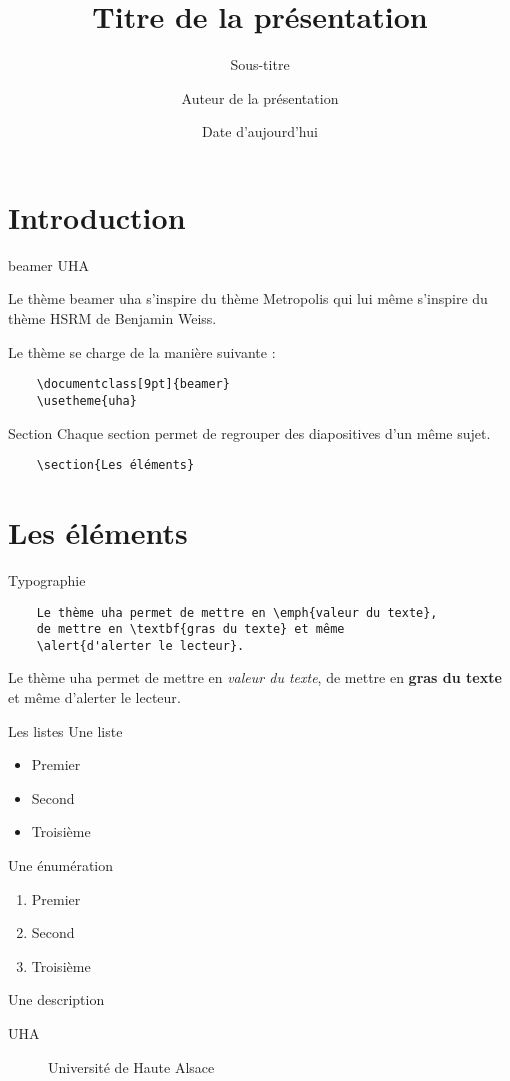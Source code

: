 \documentclass[9pt]{beamer}
\title{Titre de la présentation}
\subtitle{Sous-titre}
\date{Date d'aujourd'hui}
\author{Auteur de la présentation}
\institute{Université de Haute Alsace}
\begin{document}
\begin{frame}
	\titlepage
\end{frame}

\section{Introduction}

\begin{frame}[fragile]{beamer UHA}
	
	Le thème beamer uha s'inspire du thème Metropolis qui lui même s'inspire du thème HSRM de Benjamin Weiss.

	Le thème se charge de la manière suivante :

	\begin{verbatim}
	\documentclass[9pt]{beamer}
	\usetheme{uha}
	\end{verbatim}
\end{frame}

\begin{frame}[fragile]{Section}
	Chaque section permet de regrouper des diapositives d'un même sujet.
	\begin{verbatim}
	\section{Les éléments}
	\end{verbatim}
\end{frame}

\section{Les éléments}

\begin{frame}[fragile]{Typographie}
	\begin{verbatim}
	Le thème uha permet de mettre en \emph{valeur du texte}, 
	de mettre en \textbf{gras du texte} et même 
	\alert{d'alerter le lecteur}.
	\end{verbatim}
	Le thème uha permet de mettre en \emph{valeur du texte}, de mettre en \textbf{gras du texte} et même \alert{d'alerter le lecteur}.
\end{frame}

\begin{frame}{Les listes}
	Une liste
	\begin{itemize}
		\item Premier
		\item Second
		\item Troisième
	\end{itemize}

	Une énumération
	\begin{enumerate}
		\item Premier
		\item Second
		\item Troisième
	\end{enumerate}

	Une description
	\begin{description}
		\item [UHA] Université de Haute Alsace
	\end{description}
\end{frame}
\end{document}
